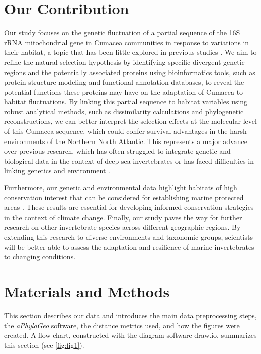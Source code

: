 \section{Our Contribution}\label{contribution}
Our study focuses on the genetic fluctuation of a partial sequence of the 16S rRNA mitochondrial gene in Cumacea communities in response to variations in their habitat, a topic that has been little explored in previous studies \citep{grassle1992deep, rex2000latitudinal}. We aim to refine the natural selection hypothesis by identifying specific divergent genetic regions and the potentially associated proteins using bioinformatics tools, such as protein structure modeling and functional annotation databases, to reveal the potential functions these proteins may have on the adaptation of Cumacea to habitat fluctuations. By linking this partial sequence to habitat variables using robust analytical methods, such as dissimilarity calculations and phylogenetic reconstructions, we can better interpret the selection effects at the molecular level of this Cumacea sequence, which could confer survival advantages in the harsh environments of the Northern North Atlantic. This represents a major advance over previous research, which has often struggled to integrate genetic and biological data in the context of deep-sea invertebrates \citep{etter1990population, vrijenhoek2009cryptic} or has faced difficulties in linking genetics and environment \citep{manel2003landscape, balkenhol2009statistical}.

Furthermore, our genetic and environmental data highlight habitats of high conservation interest that can be considered for establishing marine protected areas \citep{levin2009ecological}. These results are essential for developing informed conservation strategies in the context of climate change. Finally, our study paves the way for further research on other invertebrate species across different geographic regions. By extending this research to diverse environments and taxonomic groups, scientists will be better able to assess the adaptation and resilience of marine invertebrates to changing conditions.

\section{Materials and Methods}\label{materials-methods}
This section describes our data and introduces the main data preprocessing steps, the \textit{aPhyloGeo} software, the distance metrics used, and how the figures were created. A flow chart, constructed with the diagram software draw.io, summarizes this section (see \autoref{fig:fig1}).

